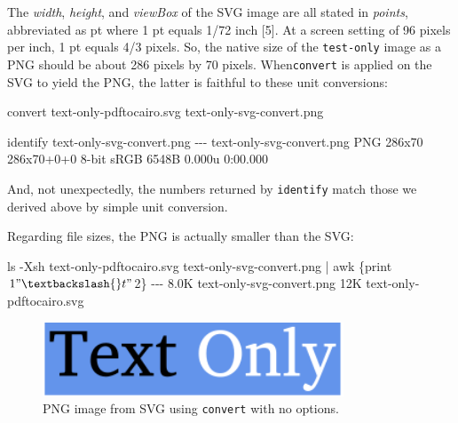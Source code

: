\documentclass[
  11pt,
  british,
  a4paper,
]{article}
\newenvironment{Shaded}{\begin{snugshade}}{\end{snugshade}}
\newcommand{\AttributeTok}[1]{\textcolor[rgb]{0.80,0.80,0.80}{#1}}
\newcommand{\ExtensionTok}[1]{\textcolor[rgb]{0.80,0.80,0.80}{#1}}
\newcommand{\FunctionTok}[1]{\textcolor[rgb]{0.94,0.94,0.56}{#1}}
\newcommand{\KeywordTok}[1]{\textcolor[rgb]{0.94,0.87,0.69}{#1}}
\newcommand{\NormalTok}[1]{\textcolor[rgb]{0.80,0.80,0.80}{#1}}
\newcommand{\StringTok}[1]{\textcolor[rgb]{0.80,0.58,0.58}{#1}}
\begin{document}
The \emph{width}, \emph{height}, and \emph{viewBox} of the SVG image are
all stated in \emph{points}, abbreviated as pt where 1 pt equals 1/72
inch {[}5{]}. At a screen setting of 96 pixels per inch, 1 pt equals 4/3
pixels. So, the native size of the \texttt{test-only} image as a PNG
should be about 286 pixels by 70 pixels. When\texttt{convert} is applied
on the SVG to yield the PNG, the latter is faithful to these unit
conversions:

\begin{Shaded}
\begin{Highlighting}[]
\ExtensionTok{convert}\NormalTok{ text{-}only{-}pdftocairo.svg text{-}only{-}svg{-}convert.png}

\ExtensionTok{identify}\NormalTok{ text{-}only{-}svg{-}convert.png}
\ExtensionTok{{-}{-}{-}}
\ExtensionTok{text{-}only{-}svg{-}convert.png}\NormalTok{ PNG 286x70 286x70+0+0 8{-}bit sRGB 6548B 0.000u 0:00.000}
\end{Highlighting}
\end{Shaded}

And, not unexpectedly, the numbers returned by \texttt{identify} match
those we derived above by simple unit conversion.
\normalfont

Regarding file sizes, the PNG is actually smaller than the SVG:

\begin{Shaded}
\begin{Highlighting}[]
\FunctionTok{ls} \AttributeTok{{-}Xsh}\NormalTok{ text{-}only{-}pdftocairo.svg text{-}only{-}svg{-}convert.png }\KeywordTok{|} \FunctionTok{awk} \StringTok{\textquotesingle{}\{print $1 "\textbackslash{}t" $2\}\textquotesingle{}}
\ExtensionTok{{-}{-}{-}}
\ExtensionTok{8.0K}\NormalTok{    text{-}only{-}svg{-}convert.png}
\ExtensionTok{12K}\NormalTok{     text{-}only{-}pdftocairo.svg}
\end{Highlighting}
\end{Shaded}

\begin{figure}
\hypertarget{fig:convertSVGtoPNG}{%
\centering
\includegraphics[width=0.8\textwidth,height=\textheight]{images/text-only-svg-convert.png}
\caption{PNG image from SVG using \texttt{convert} with no
options.}\label{fig:convertSVGtoPNG}
}
\end{figure}
\end{document}
